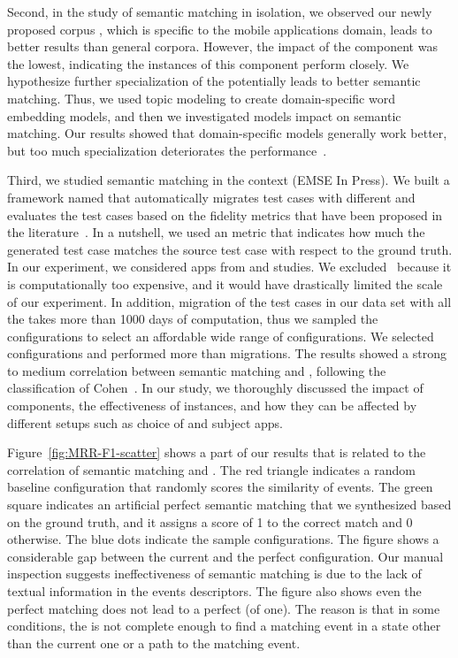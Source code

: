 \bigskip
Second, in the study of semantic matching in isolation, we observed our newly proposed corpus \gp, which is specific to the mobile applications domain, leads to better results than general corpora.  
However, the impact of the \corpus component was the lowest, indicating the instances of this component perform closely. 
We hypothesize further specialization of the \corpus  potentially leads to better semantic matching.  
Thus, we used topic modeling to create domain-specific word embedding models, and then we investigated models  impact on semantic matching.
Our results showed that domain-specific models generally work better, but too much specialization deteriorates the performance~\cite{khalili:DomainEmbedding:ICPC:2022}.



\bigskip
Third, we studied semantic matching in the \testreuse context (EMSE In Press).
We built a framework named \tme that automatically migrates test cases with different \smconfigs and evaluates the test cases based on the fidelity metrics that have been proposed in the literature~\cite{zhao:fruiter:fse:2020}.
In a nutshell, we used an \fscore metric that indicates how much the generated test case matches the source test case with respect to the ground truth.
In our experiment, we considered  \nexecapps apps from \atm and \craftdroid studies.
We excluded \adaptdroid~\selector because it is computationally too expensive, and it would have drastically limited the scale of our experiment.
In addition, migration of the test cases in our data set with all the \smconfigs takes more than 1000 days of computation, thus we sampled the configurations to select an affordable wide range of configurations.  
We selected \nsampledcomb configurations and performed more than \nmigrations migrations.
The results showed a strong to medium correlation between semantic matching and \testreuse, following the classification of Cohen~\cite{cohen:statisticalpower:Routledge:2013}.
In our study, we  thoroughly discussed the impact of components, the effectiveness of instances, and how they can be affected by different setups such as choice of \selector and subject apps.

\bigskip
Figure~\ref{fig:MRR-F1-scatter} shows a part of our results that is related to the correlation of semantic matching and \testreuse.
The red triangle indicates a random baseline configuration that randomly scores the similarity of events.
The green square indicates an artificial perfect semantic matching that we synthesized based on the ground truth, and it  assigns a score of 1 to the correct match and 0 otherwise.
The blue dots indicate the sample configurations.
The figure shows a considerable gap between the current \smconfigs and the perfect configuration. 
Our manual inspection suggests ineffectiveness of semantic matching is due to the lack of textual information in the events descriptors.
The figure also shows even the perfect matching does not lead to a perfect \testreuse (\fscore of one).
The reason is that in some conditions, the \tam is not complete enough to find a matching event in a state other than the current one or a path to the matching event.





